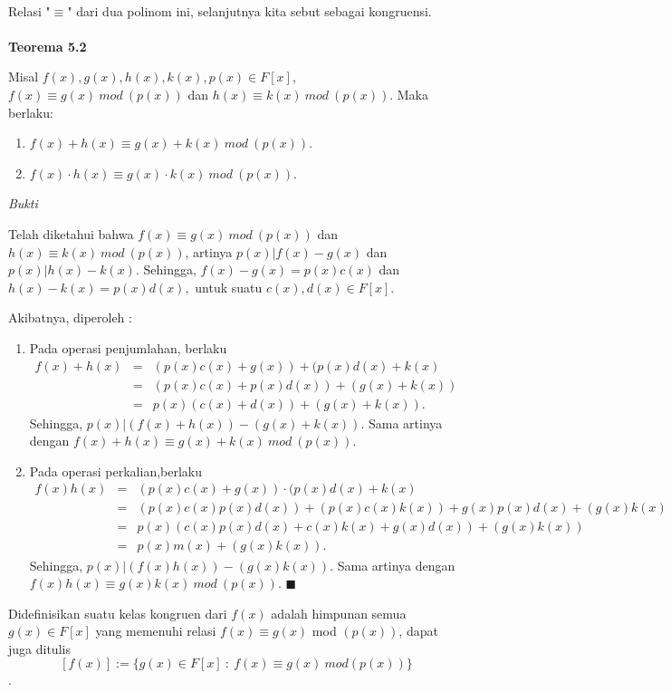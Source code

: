 \\
\par 	Relasi "$\equiv$"  dari dua polinom ini, selanjutnya kita sebut sebagai kongruensi.
\\
\\
	\textbf{Teorema 5.2}
\par 	Misal $f(x),g(x),h(x),k(x),p(x) \in F[x]$, $f(x)\equiv g(x)~mod~(p(x))$ dan $h(x)\equiv k(x)~mod~(p(x))$. Maka berlaku:
	\begin{enumerate}
	\item $f(x)+h(x)\equiv g(x)+k(x)~mod~(p(x))$.
	\item $f(x)\cdot h(x)\equiv g(x) \cdot k(x)~mod~(p(x))$.
	\end{enumerate}
	\textit{Bukti}
\par 	Telah diketahui bahwa $f(x)\equiv g(x)~mod~(p(x))$ dan $h(x)\equiv k(x)~mod~(p(x))$, artinya $p(x)|f(x)-g(x)$ dan $p(x)|h(x)-k(x).$ Sehingga, $f(x)-g(x)= p(x)c(x)$ dan $h(x)-k(x)= p(x)d(x),$ untuk suatu $c(x),d(x) \in F[x].$
\par 	Akibatnya, diperoleh :
	\begin{enumerate}
	\item Pada operasi penjumlahan, berlaku\\
		$\begin{array}{rcl}
		f(x)+h(x) &=& (p(x)c(x)+g(x)) + (p(x)d(x)+k(x)\\
		&=& (p(x)c(x)+p(x)d(x))+(g(x)+k(x))\\
		&=& p(x)(c(x)+d(x)) + (g(x)+k(x)).
		\end{array}$
\\	Sehingga, $p(x)|(f(x)+h(x))-(g(x)+k(x))$. Sama artinya dengan $f(x)+h(x)\equiv g(x)+k(x)~mod~(p(x))$.
	\item Pada operasi perkalian,berlaku\\
	$\begin{array}{rcl}
		f(x)h(x) &=& (p(x)c(x)+g(x))\cdot (p(x)d(x)+k(x)\\
		&=& (p(x)c(x)p(x)d(x))+(p(x)c(x)k(x))+g(x)p(x)d(x)+(g(x)k(x))\\
		&=& p(x)(c(x)p(x)d(x)+c(x)k(x)+g(x)d(x)) + (g(x)k(x))\\
		&=& p(x)m(x) +(g(x)k(x)).
		\end{array}$
\\	Sehingga, $p(x)|(f(x)h(x))-(g(x)k(x))$. Sama artinya dengan \\$f(x)h(x)\equiv g(x)k(x)~mod~(p(x))$. $\blacksquare$
	\end{enumerate}	
\par 	Didefinisikan suatu kelas kongruen dari $f(x)$ adalah himpunan semua $g(x) \in F[x]$ yang memenuhi relasi $f(x) \equiv g(x)$ mod $(p(x))$, dapat juga ditulis $$[f(x)] := \{ g(x) \in F[x]~:~f(x)\equiv g(x) ~mod (p(x)) \} $$.

